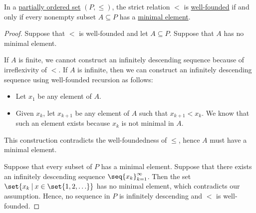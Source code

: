 \begin{proposition}\label{thm:infinite_descent_partial_order}
  In a \hyperref[def:partially_ordered_set]{partially ordered set} \( (P, \leq) \), the strict relation \( < \) is \hyperref[def:well_founded_relation]{well-founded} if and only if every nonempty subset \( A \subseteq P \) has a \hyperref[def:extremal_points/maximal_and_minimal_element]{minimal element}.
\end{proposition}
\begin{proof}
  \SufficiencySubProof Suppose that \( < \) is well-founded and let \( A \subseteq P \). Suppose that \( A \) has no minimal element.

  If \( A \) is finite, we cannot construct an infinitely descending sequence because of irreflexivity of \( < \). If \( A \) is infinite, then we can construct an infinitely descending sequence using well-founded recursion as follows:
  \begin{itemize}
    \item Let \( x_1 \) be any element of \( A \).
    \item Given \( x_k \), let \( x_{k+1} \) be any element of \( A \) such that \( x_{k+1} < x_k \). We know that such an element exists because \( x_k \) is not minimal in \( A \).
  \end{itemize}

  This construction contradicts the well-foundedness of  \( \leq \), hence \( A \) must have a minimal element.

  \NecessitySubProof Suppose that every subset of \( P \) has a minimal element. Suppose that there exists an infinitely descending sequence \( \seq{ x_k }_{k=1}^\infty \). Then the set \( \set{ x_k \given x \in \set{ 1, 2, \ldots } } \) has no minimal element, which contradicts our assumption. Hence, no sequence in \( P \) is infinitely descending and \( < \) is well-founded.
\end{proof}

